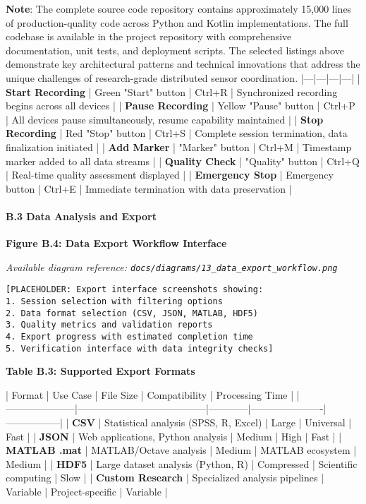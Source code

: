 \documentclass[11pt,a4paper]{article}
\begin{document}
\textbf{Note}: The complete source code repository contains approximately 15,000 lines of production-quality code across
Python and Kotlin implementations. The full codebase is available in the project repository with comprehensive
documentation, unit tests, and deployment scripts. The selected listings above demonstrate key architectural patterns
and technical innovations that address the unique challenges of research-grade distributed sensor coordination.
|---|---|---|---|
| \textbf{Start Recording} | Green "Start" button | Ctrl+R | Synchronized recording begins across all devices |
| \textbf{Pause Recording} | Yellow "Pause" button | Ctrl+P | All devices pause simultaneously, resume capability
maintained |
| \textbf{Stop Recording} | Red "Stop" button | Ctrl+S | Complete session termination, data finalization initiated |
| \textbf{Add Marker} | "Marker" button | Ctrl+M | Timestamp marker added to all data streams |
| \textbf{Quality Check} | "Quality" button | Ctrl+Q | Real-time quality assessment displayed |
| \textbf{Emergency Stop} | Emergency button | Ctrl+E | Immediate termination with data preservation |

\paragraph{B.3 Data Analysis and Export}

\textbf{Figure B.4: Data Export Workflow Interface}

\textit{Available diagram reference: \texttt{docs/diagrams/13\_data\_export\_workflow.png}}

\begin{verbatim}
[PLACEHOLDER: Export interface screenshots showing:
1. Session selection with filtering options
2. Data format selection (CSV, JSON, MATLAB, HDF5)
3. Quality metrics and validation reports
4. Export progress with estimated completion time
5. Verification interface with data integrity checks]
\end{verbatim}

\textbf{Table B.3: Supported Export Formats}

| Format              | Use Case                              | File Size  | Compatibility        | Processing Time |
|---------------------|---------------------------------------|------------|----------------------|-----------------|
| \textbf{CSV}             | Statistical analysis (SPSS, R, Excel) | Large      | Universal            | Fast            |
| \textbf{JSON}            | Web applications, Python analysis     | Medium     | High                 | Fast            |
| \textbf{MATLAB .mat}     | MATLAB/Octave analysis                | Medium     | MATLAB ecosystem     | Medium          |
| \textbf{HDF5}            | Large dataset analysis (Python, R)    | Compressed | Scientific computing | Slow            |
| \textbf{Custom Research} | Specialized analysis pipelines        | Variable   | Project-specific     | Variable        |
\end{document}
